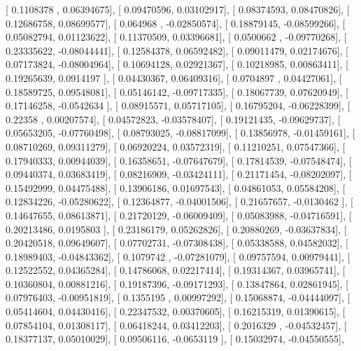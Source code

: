\documentclass{article}
\begin{document}
       [ 0.1108378 ,  0.06394675],
       [ 0.09470596,  0.03102917],
       [ 0.08374593,  0.08470826],
       [ 0.12686758,  0.08699577],
       [ 0.064968  , -0.02850574],
       [ 0.18879145, -0.08599266],
       [ 0.05082794,  0.01123622],
       [ 0.11370509,  0.03396681],
       [ 0.0500662 , -0.09770268],
       [ 0.23335622, -0.08044441],
       [ 0.12584378,  0.06592482],
       [ 0.09011479,  0.02174676],
       [ 0.07173824, -0.08004964],
       [ 0.10694128,  0.02921367],
       [ 0.10218985,  0.00863411],
       [ 0.19265639,  0.0914197 ],
       [ 0.04430367,  0.06409316],
       [ 0.0704897 ,  0.04427061],
       [ 0.18589725,  0.09548081],
       [ 0.05146142, -0.09717335],
       [ 0.18067739,  0.07620949],
       [ 0.17146258, -0.0542634 ],
       [ 0.08915571,  0.05717105],
       [ 0.16795204, -0.06228399],
       [ 0.22358   ,  0.00207574],
       [ 0.04572823, -0.03578407],
       [ 0.19121435, -0.09629737],
       [ 0.05653205, -0.07760498],
       [ 0.08793025, -0.08817099],
       [ 0.13856978, -0.01459161],
       [ 0.08710269,  0.09311279],
       [ 0.06920224,  0.03572319],
       [ 0.11210251,  0.07547366],
       [ 0.17940333,  0.00944039],
       [ 0.16358651, -0.07647679],
       [ 0.17814539, -0.07548474],
       [ 0.09440374,  0.03683419],
       [ 0.08216909, -0.03424111],
       [ 0.21171454, -0.08202097],
       [ 0.15492999,  0.04475488],
       [ 0.13906186,  0.01697543],
       [ 0.04861053,  0.05584208],
       [ 0.12834226, -0.05280622],
       [ 0.12364877, -0.04001506],
       [ 0.21657657, -0.0130462 ],
       [ 0.14647655,  0.08613871],
       [ 0.21720129, -0.06009409],
       [ 0.05083988, -0.04716591],
       [ 0.20213486,  0.0195803 ],
       [ 0.23186179,  0.05262826],
       [ 0.20880269, -0.03637834],
       [ 0.20420518,  0.09649607],
       [ 0.07702731, -0.07308438],
       [ 0.05338588,  0.04582032],
       [ 0.18989403, -0.04843362],
       [ 0.1079742 , -0.07281079],
       [ 0.09757594,  0.00979441],
       [ 0.12522552,  0.04365284],
       [ 0.14786068,  0.02217414],
       [ 0.19314367,  0.03965741],
       [ 0.10360804,  0.00881216],
       [ 0.19187396, -0.09171293],
       [ 0.13847864,  0.02861945],
       [ 0.07976403, -0.00951819],
       [ 0.1355195 ,  0.00997292],
       [ 0.15068874, -0.04444097],
       [ 0.05414604,  0.04430416],
       [ 0.22347532,  0.00370605],
       [ 0.16215319,  0.01390615],
       [ 0.07854104,  0.01308117],
       [ 0.06418244,  0.03412203],
       [ 0.2016329 , -0.04532457],
       [ 0.18377137,  0.05010029],
       [ 0.09506116, -0.0653119 ],
       [ 0.15032974, -0.04550555],
\end{document}
